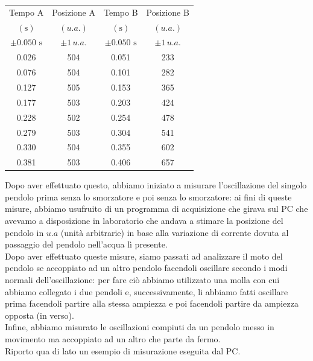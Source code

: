 \documentclass{article}
\begin{document}
\begin{minipage}{0.5\textwidth}
    \centering
    \begin{tabular}{c c c c}
        \toprule
        Tempo A & Posizione A & Tempo B & Posizione B \\
        $(\si{\second})$ &  $(u.a.)$ & $(\si{\second})$ & $(u.a.)$ \\
        $\pm 0.050 \, \, \si{\second}$ & $\pm 1 \, u.a.$ & $\pm 0.050 \, \, \si{\second}$ & $\pm 1 \, u.a.$ \\ \toprule
        0.026 & 504 & 0.051 & 233 \\
        0.076 & 504 & 0.101 & 282 \\
        0.127 & 505 & 0.153 & 365 \\
        0.177 & 503 & 0.203 & 424 \\
        0.228 & 502 & 0.254 & 478 \\
        0.279 & 503 & 0.304 & 541 \\
        0.330 & 504 & 0.355 & 602 \\
        0.381 & 503 & 0.406 & 657 \\ \bottomrule
    \end{tabular}
    \captionsetup{format=plain}
\end{minipage}
\hspace{0.01\textwidth}
\begin{minipage}{0.49\textwidth}
Dopo aver effettuato questo, abbiamo iniziato a misurare l'oscillazione del singolo pendolo prima senza lo smorzatore e poi senza lo smorzatore: ai fini di queste misure, abbiamo usufruito di un programma di acquisizione che girava sul PC che avevamo a disposizione in laboratorio che andava a stimare la posizione del pendolo in $u.a$ (unità arbitrarie) in base alla variazione di corrente dovuta al passaggio del pendolo nell'acqua lì presente. \\
Dopo aver effettuato queste misure, siamo passati ad analizzare il moto del pendolo se accoppiato ad un altro pendolo facendoli oscillare secondo i modi normali dell'oscillazione: per fare ciò abbiamo utilizzato una molla con cui abbiamo collegato i due pendoli e, successivamente, li abbiamo fatti oscillare prima facendoli partire alla stessa ampiezza e poi facendoli partire da ampiezza opposta (in verso). \\
Infine, abbiamo misurato le oscillazioni compiuti da un pendolo messo in movimento ma accoppiato ad un altro che parte da fermo. \\
Riporto qua di lato un esempio di misurazione eseguita dal PC.
\end{minipage}
\end{document}
